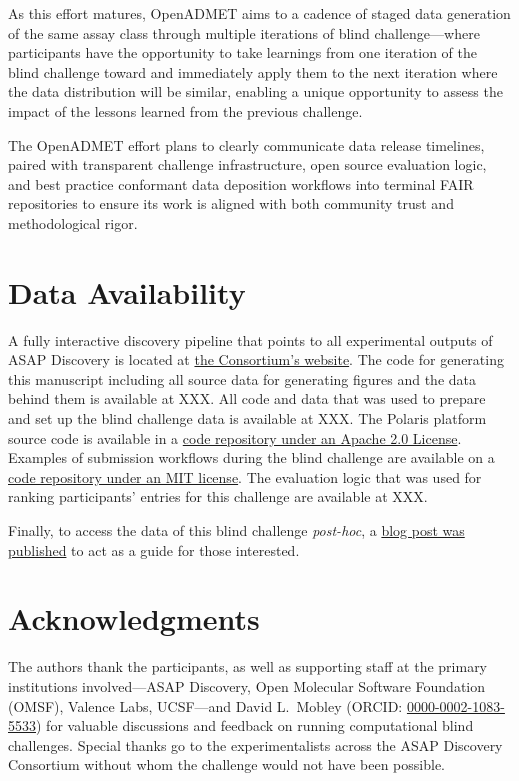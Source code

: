 \documentclass[journal=jcim,manuscript=article]{achemso}
\begin{document}
As this effort matures, OpenADMET aims to a cadence of staged data generation of the same assay class through multiple iterations of blind challenge---where participants have the opportunity to take learnings from one iteration of the blind challenge toward and immediately apply them to the next iteration where the data distribution will be similar, enabling a unique opportunity to assess the impact of the lessons learned from the previous challenge. 

The OpenADMET effort plans to clearly communicate data release timelines, paired with transparent challenge infrastructure, open source evaluation logic, and best practice conformant data deposition workflows into terminal FAIR repositories to ensure its work is aligned with both community trust and methodological rigor.

\section{Data Availability}
A fully interactive discovery pipeline that points to all experimental outputs of ASAP Discovery is located at \href{https://asapdiscovery.org/pipeline/}{the Consortium's website}. The code for generating this manuscript including all source data for generating figures and the data behind them is available at XXX. All code and data that was used to prepare and set up the blind challenge data is available at XXX. The Polaris platform source code is available in a \href{https://github.com/polaris-hub/polaris}{code repository under an Apache 2.0 License}. Examples of submission workflows during the blind challenge are available on a \href{https://github.com/asapdiscovery/asap-polaris-blind-challenge-examples}{code repository under an MIT license}. The evaluation logic that was used for ranking participants' entries for this challenge are available at XXX. 

Finally, to access the data of this blind challenge \textit{post-hoc}, a \href{https://blog.omsf.io/how-to-access-the-asap-discovery-x-polarishub-x-openadmet-challenge-data/}{blog post was published} to act as a guide for those interested.

\section{Acknowledgments}

The authors thank the participants, as well as supporting staff at the primary institutions involved---ASAP Discovery, Open Molecular Software Foundation (OMSF), Valence Labs, UCSF---and David L.\ Mobley (ORCID: \href{https://orcid.org/0000-0002-1083-5533}{0000-0002-1083-5533}) for valuable discussions and feedback on running computational blind challenges. Special thanks go to the experimentalists across the ASAP Discovery Consortium without whom the challenge would not have been possible. 
\end{document}
